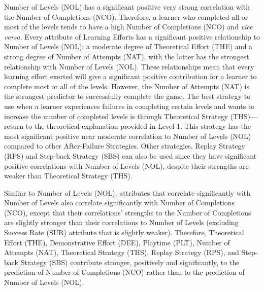 \documentclass[conference]{IEEEtran}
\begin{document}
Number of Levels (NOL) has a significant positive very strong correlation with the Number of Completions (NCO). Therefore, a learner who completed all or most of the levels tends to have a high Number of Completions (NCO) and \textit{vice versa}. Every attribute of Learning Efforts has a significant positive relationship to Number of Levels (NOL): a moderate degree of Theoretical Effort (THE) and a strong degree of Number of Attempts (NAT), with the latter has the strongest relationship with Number of Levels (NOL). These relationships mean that every learning effort exerted will give a significant positive contribution for a learner to complete most or all of the levels. However, the Number of Attempts (NAT) is the strongest predictor to successfully complete the game. 
The best strategy to use when a learner experiences failures in completing certain levels and wants to increase the number of completed levels is through Theoretical Strategy (THS)—return to the theoretical explanation provided in Level 1. This strategy has the most significant positive near moderate correlation to Number of Levels (NOL) compared to other After-Failure Strategies. Other strategies, Replay Strategy (RPS) and Step-back Strategy (SBS) can also be used since they have significant positive correlations with Number of Levels (NOL), despite their strengths are weaker than Theoretical Strategy (THS).

Similar to Number of Levels (NOL), attributes that correlate significantly with Number of Levels also correlate significantly with Number of Completions (NCO), except that their correlations’ strengths to the Number of Completions are slightly stronger than their correlations to Number of Levels (excluding Success Rate (SUR) attribute that is slightly weaker). Therefore, Theoretical Effort (THE), Demonstrative Effort (DEE), Playtime (PLT), Number of Attempts (NAT), Theoretical Strategy (THS), Replay Strategy (RPS), and Step-back Strategy (SBS) contribute stronger, positively and significantly, to the prediction of Number of Completions (NCO) rather than to the prediction of Number of Levels (NOL).
\end{document}
